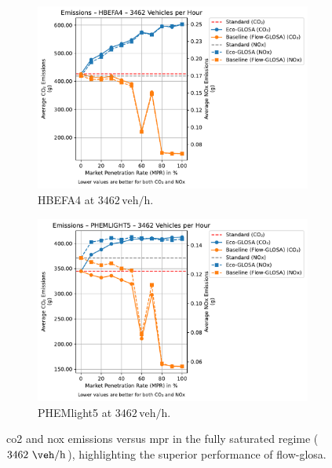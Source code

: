 \begin{figure}[htbp]
  \centering
  \begin{subfigure}[b]{0.98\textwidth}
    \includegraphics[width=\textwidth]{data/img/Emissions/Emissions_HBEFA4_Cars3462.pdf}
    \caption{HBEFA4 at $3462\,\mathrm{veh/h}$.}
    \label{fig:Emis_3462_HBEFA4}
  \end{subfigure}
  \begin{subfigure}[b]{0.98\textwidth}
    \includegraphics[width=\textwidth]{data/img/Emissions/Emissions_PHEMLIGHT5_Cars3462.pdf}
    \caption{PHEMlight5 at $3462\,\mathrm{veh/h}$.}
    \label{fig:Emis_3462_PHEM}
  \end{subfigure}
  \caption[\ac{co2} and \ac{nox} emissions vs. \ac{mpr} at $3462~\unit{\veh\per\hour}$]{\ac{co2} and \ac{nox} emissions versus \ac{mpr} in the fully saturated regime ($3462~\unit{\veh\per\hour}$), highlighting the superior performance of \ac{flow-glosa}.}
  \label{fig:Emis_3462}
\end{figure}

